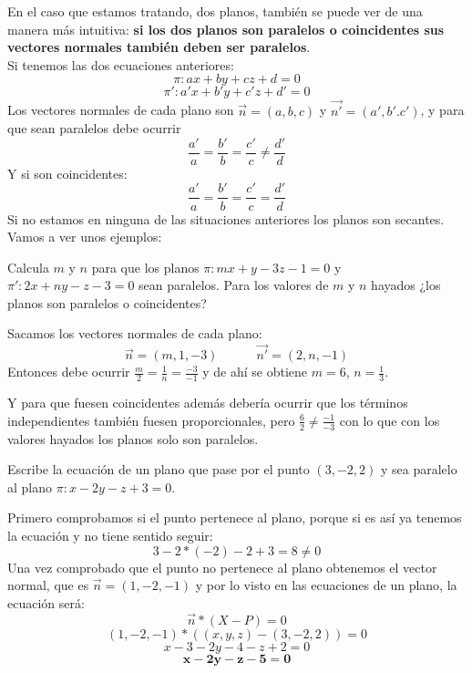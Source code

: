 \documentclass[a4paper,11pt,answers]{exam}
\begin{document}
En el caso que estamos tratando, dos planos, también se puede ver de una manera más intuitiva: \textbf{si los dos planos son paralelos o coincidentes sus vectores normales también deben ser paralelos}.\\
Si tenemos las dos ecuaciones anteriores:
\[\pi: ax + by + cz + d = 0\]
\[\pi': a'x + b'y + c'z + d' = 0\]
Los vectores normales de cada plano son $\vec{n} = (a, b, c)$ y $\vec{n'} = (a',b'.c')$, y para que sean paralelos debe ocurrir
\[\frac{a'}{a} = \frac{b'}{b} = \frac{c'}{c} \neq \frac{d'}{d}\]
Y si son coincidentes:
\[\frac{a'}{a} = \frac{b'}{b} = \frac{c'}{c} = \frac{d'}{d}\]
Si no estamos en ninguna de las situaciones anteriores los planos son secantes.
Vamos a ver unos ejemplos:
\begin{questions}
	\question Calcula $m$ y $n$ para que los planos $\pi: mx + y -3z -1 = 0$ y $\pi': 2x + ny - z - 3 = 0$ sean paralelos. Para los valores de $m$ y $n$ hayados ¿los planos son paralelos o coincidentes?
	\begin{solution}
		Sacamos los vectores normales de cada plano:
		\[\vec{n} = (m,1,-3)\quad\quad\quad\vec{n'} =(2,n,-1)\]
		Entonces debe ocurrir $\frac{m}{2} = \frac{1}{n} = \frac{-3}{-1}$ y de ahí se obtiene $m=6$, $n=\frac{1}{3}$.
		
		Y para que fuesen coincidentes además debería ocurrir que los términos independientes también fuesen proporcionales, pero $\frac{6}{2} \neq \frac{-1}{-3}$ con lo que con los valores hayados los planos solo son paralelos.
	\end{solution}

	\question Escribe la ecuación de un plano que pase por el punto $(3, -2, 2)$ y sea paralelo al plano $\pi: x - 2y -z + 3 = 0$.
	\begin{solution}
		Primero comprobamos si el punto pertenece al plano, porque si es así ya tenemos la ecuación y no tiene sentido seguir:
		\[3 - 2*(-2) - 2 + 3 = 8 \neq 0\]
		Una vez comprobado que el punto no pertenece al plano obtenemos el vector normal, que es $\vec n = (1,-2,-1)$ y por lo visto en las ecuaciones de un plano, la ecuación será:
		\[\vec{n} * (X-P) = 0\]
		\[(1,-2,-1)* ((x,y,z) - (3,-2,2)) = 0\]
		\[x-3 -2y - 4 -z +2 = 0\]
		\[\boldsymbol{x - 2y -z -5 = 0}\]
	\end{solution}
\end{questions}
\end{document}
